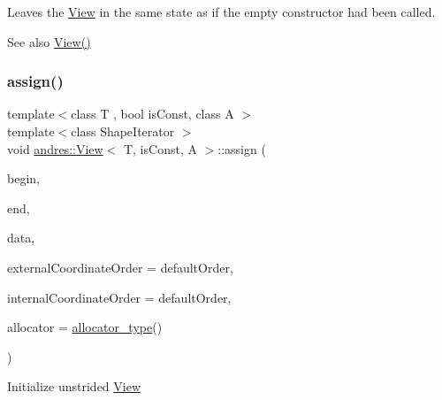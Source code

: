 Leaves the \hyperlink{classandres_1_1View}{View} in the same state as if the empty constructor had been called.

\begin{DoxySeeAlso}{See also}
\hyperlink{classandres_1_1View_a2658181be4befdf722462ab951ba8a67}{View()} 
\end{DoxySeeAlso}
\mbox{\label{classandres_1_1View_ab227fd41b348249cbc149b5cff2cee49}} 
\subsubsection{\texorpdfstring{assign()}{assign()}\hspace{0.1cm}{\footnotesize\ttfamily [2/3]}}
{\footnotesize\ttfamily template$<$class T , bool is\+Const, class A $>$ \\
template$<$class Shape\+Iterator $>$ \\
void \hyperlink{classandres_1_1View}{andres\+::\+View}$<$ T, is\+Const, A $>$\+::assign (\begin{DoxyParamCaption}\item[{Shape\+Iterator}]{begin,  }\item[{Shape\+Iterator}]{end,  }\item[{\hyperlink{classandres_1_1View_a9a201594c82be89fccd0fe644ea2f09c}{pointer}}]{data,  }\item[{const \hyperlink{namespaceandres_a2ac8b7aa89d44e8188a7c0ba50f4306b}{Coordinate\+Order} \&}]{external\+Coordinate\+Order = {\ttfamily defaultOrder},  }\item[{const \hyperlink{namespaceandres_a2ac8b7aa89d44e8188a7c0ba50f4306b}{Coordinate\+Order} \&}]{internal\+Coordinate\+Order = {\ttfamily defaultOrder},  }\item[{const \hyperlink{classandres_1_1View_a175e5862a7133a937e7901e5894c2e10}{allocator\+\_\+type} \&}]{allocator = {\ttfamily \hyperlink{classandres_1_1View_a175e5862a7133a937e7901e5894c2e10}{allocator\+\_\+type}()} }\end{DoxyParamCaption})\hspace{0.3cm}{\ttfamily [inline]}}

Initialize unstrided \hyperlink{classandres_1_1View}{View}



